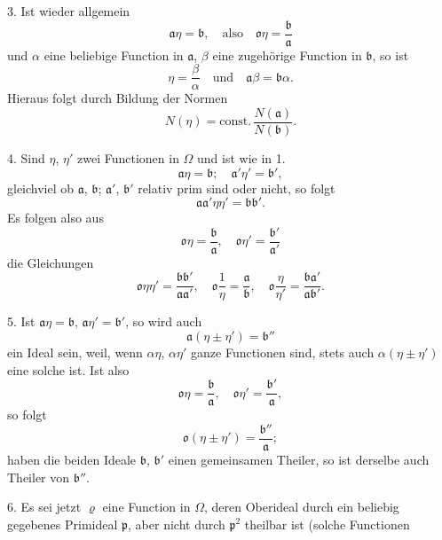 \documentclass{article}
\begin{document}
3. Ist wieder allgemein
\[ \mathfrak{a}\eta = \mathfrak{b}, \quad \text{also} \quad \mathfrak{o}\eta = \frac{\mathfrak{b}}{\mathfrak{a}} \]
und $\alpha$ eine beliebige Function in $\mathfrak{a}$, $\beta$ eine zugehörige Function in $\mathfrak{b}$, so ist
\[ \eta = \frac{\beta}{\alpha} \quad \text{und} \quad \mathfrak{a}\beta = \mathfrak{b}\alpha. \]
Hieraus folgt durch Bildung der Normen
\[ N(\eta) = \text{const.}\,\frac{N(\mathfrak{a})}{N(\mathfrak{b})}. \]

4. Sind $\eta$, $\eta'$ zwei Functionen in $\Omega$ und ist wie in 1.
\[ \mathfrak{a}\eta = \mathfrak{b}; \quad \mathfrak{a}'\eta' = \mathfrak{b}', \]
gleichviel ob $\mathfrak{a}$, $\mathfrak{b}$; $\mathfrak{a}'$, $\mathfrak{b}'$ relativ prim sind oder nicht, so folgt
\[ \mathfrak{a}\mathfrak{a}'\eta\eta' = \mathfrak{b}\mathfrak{b}'. \]
Es folgen also aus
\[ \mathfrak{o}\eta = \frac{\mathfrak{b}}{\mathfrak{a}}, \quad \mathfrak{o}\eta' = \frac{\mathfrak{b}'}{\mathfrak{a}'} \]
die Gleichungen
\[ \mathfrak{o}\eta\eta' = \frac{\mathfrak{b}\mathfrak{b}'}{\mathfrak{a}\mathfrak{a}'}, \quad \mathfrak{o}\frac{1}{\eta} = \frac{\mathfrak{a}}{\mathfrak{b}}, \quad \mathfrak{o}\frac{\eta}{\eta'} = \frac{\mathfrak{b}\mathfrak{a}'}{\mathfrak{a}\mathfrak{b}'}. \]

5. Ist $\mathfrak{a}\eta = \mathfrak{b}$, $\mathfrak{a}\eta' = \mathfrak{b}'$, so wird auch
\[ \mathfrak{a}(\eta \pm \eta') = \mathfrak{b}'' \]
ein Ideal sein, weil, wenn $\alpha\eta$, $\alpha\eta'$ ganze Functionen sind, stets auch $\alpha(\eta \pm \eta')$ eine solche ist. Ist also
\[ \mathfrak{o}\eta = \frac{\mathfrak{b}}{\mathfrak{a}}, \quad \mathfrak{o}\eta' = \frac{\mathfrak{b}'}{\mathfrak{a}}, \]
so folgt
\[ \mathfrak{o}(\eta \pm \eta') = \frac{\mathfrak{b}''}{\mathfrak{a}}; \]
haben die beiden Ideale $\mathfrak{b}$, $\mathfrak{b}'$ einen gemeinsamen Theiler, so ist derselbe auch Theiler von $\mathfrak{b}''$.

6. Es sei jetzt $\varrho$ eine Function in $\Omega$, deren Oberideal durch ein beliebig gegebenes Primideal $\mathfrak{p}$, aber nicht durch $\mathfrak{p}^{2}$ theilbar ist (solche Functionen
\end{document}
